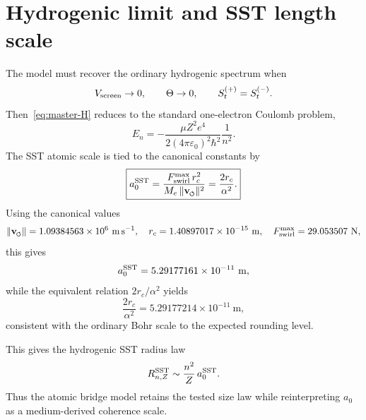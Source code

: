 \documentclass[11pt,a4paper]{article}
\newcommand{\swirlarrow}{\mathchoice{\mkern-2mu\scriptstyle\boldsymbol{\circlearrowleft}}{\mkern-2mu\scriptstyle\boldsymbol{\circlearrowleft}}{\mkern-2mu\scriptscriptstyle\boldsymbol{\circlearrowleft}}{\mkern-2mu\scriptscriptstyle\boldsymbol{\circlearrowleft}}}
\newcommand{\vswirl}{\mathbf{v}_{\swirlarrow}}
\newcommand{\rc}{r_c}
\begin{document}
\section{Hydrogenic limit and SST length scale}
The model must recover the ordinary hydrogenic spectrum when
\begin{equation}
V_{\rm screen}\to 0,
\qquad
\Theta\to 0,
\qquad
S_t^{(+)}=S_t^{(-)}.
\end{equation}
Then~\eqref{eq:master-H} reduces to the standard one-electron Coulomb problem,
\begin{equation}
\label{eq:En}
E_n=-\frac{\mu Z^2 e^4}{2(4\pi\varepsilon_0)^2\hbar^2}\frac{1}{n^2}.
\end{equation}
The SST atomic scale is tied to the canonical constants by
\begin{equation}
\label{eq:a0-sst}
\boxed{
a_0^{\rm SST}
=
\frac{F_{\rm swirl}^{\max}\,\rc^2}{M_e\,\lVert\vswirl\rVert^2}
=
\frac{2\rc}{\alpha^2}.
}
\end{equation}
Using the canonical values
\begin{equation}
\lVert\vswirl\rVert = 1.09384563\times 10^6\ \mathrm{m\,s^{-1}},
\quad
\rc = 1.40897017\times 10^{-15}\ \mathrm{m},
\quad
F_{\rm swirl}^{\max}=29.053507\ \mathrm{N},
\end{equation}
this gives
\begin{equation}
\label{eq:a0-num}
a_0^{\rm SST}
=
5.29177161\times 10^{-11}\ \mathrm{m},
\end{equation}
while the equivalent relation $2\rc/\alpha^2$ yields
\begin{equation}
\label{eq:a0-num2}
\frac{2\rc}{\alpha^2}=5.29177214\times 10^{-11}\ \mathrm{m},
\end{equation}
consistent with the ordinary Bohr scale to the expected rounding level.

This gives the hydrogenic SST radius law
\begin{equation}
\label{eq:RnZ}
R_{n,Z}^{\rm SST}\sim \frac{n^2}{Z}\,a_0^{\rm SST}.
\end{equation}
Thus the atomic bridge model retains the tested size law while reinterpreting $a_0$ as a medium-derived coherence scale.
\end{document}
